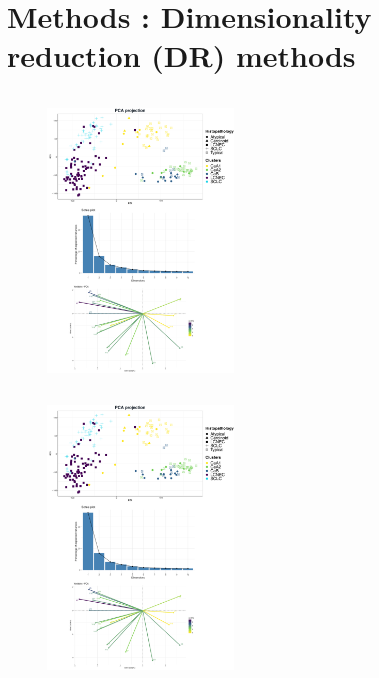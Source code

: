 \documentclass[compress]{beamer}
\begin{document}


\section{Methods : Dimensionality reduction (DR) methods}
\begin{frame}
\vspace*{-1.4cm}

    \begin{overprint}
\begin{columns}[c]
  \begin{column}{0.5\linewidth}
  \begin{figure}
\centering
\includegraphics[height=7cm]{figures/methods/pca-methods2.pdf}
  \end{figure}
  \end{column}
  \hspace{-0.7cm}
  \begin{column}{0.5\linewidth}
  \end{column}
 \end{columns} 
 
  
\begin{columns}[c]
  \begin{column}{0.5\linewidth}
  \begin{figure}
\centering
\includegraphics[height=7cm]{figures/methods/pca-methods2.pdf}
  \end{figure}
  \end{column}


\end{columns}
\end{overprint}
\end{frame}
\end{document}

